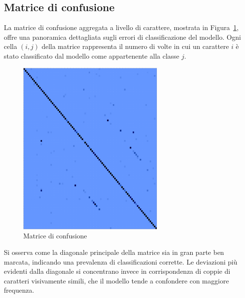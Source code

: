 \subsection{Matrice di confusione}
La matrice di confusione aggregata a livello di carattere, mostrata in Figura~\ref{fig:confusion_matrix}, offre una panoramica dettagliata sugli errori di classificazione del modello. Ogni cella \((i, j)\) della matrice rappresenta il numero di volte in cui un carattere \(i\) è stato classificato dal modello come appartenente alla classe \(j\).
\begin{figure}[htbp]
    \centering
    \includegraphics[width=0.65\textwidth]{images/confusion_matrix.png}
    \caption{Matrice di confusione}
    \label{fig:confusion_matrix}
\end{figure}

Si osserva come la diagonale principale della matrice sia in gran parte ben marcata, indicando una prevalenza di classificazioni corrette. Le deviazioni più evidenti dalla diagonale si concentrano invece in corrispondenza di coppie di caratteri visivamente simili, che il modello tende a confondere con maggiore frequenza.

